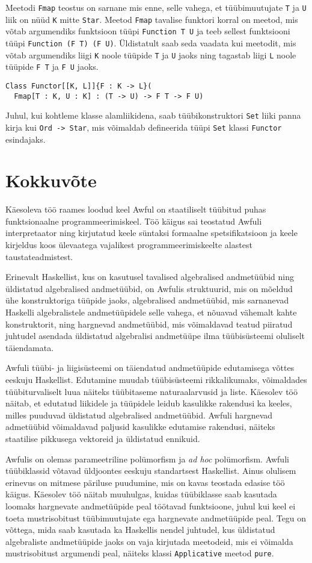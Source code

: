 \documentclass[12pt]{article}
\newcommand\peatykk[1]{
  \clearpage
  \section{#1}}
\begin{document}
        Meetodi \verb!Fmap! teostus on sarnane mis enne, selle vahega, et tüübimuutujate \verb!T! ja \verb!U! liik on nüüd \verb!K! mitte \verb!Star!. Meetod \verb!Fmap! tavalise funktori korral on meetod, mis võtab argumendiks funktsioon tüüpi \verb!Function T U! ja teeb sellest funktsiooni tüüpi \verb!Function (F T) (F U)!. Üldistatult saab seda vaadata kui meetodit, mis võtab argumendiks liigi \verb!K! noole tüüpide \verb!T! ja \verb!U! jaoks ning tagastab liigi \verb!L! noole tüüpide \verb!F T! ja \verb!F U! jaoks.

        \begin{verbatim}Class Functor[[K, L]]{F : K -> L}(
  Fmap[T : K, U : K] : (T -> U) -> F T -> F U)\end{verbatim}

        Juhul, kui kohtleme klasse alamliikidena, saab tüübikonstruktori \verb!Set! liiki panna kirja kui \verb!Ord -> Star!, mis võimaldab defineerida tüüpi \verb!Set! klassi \verb!Functor! esindajaks.
  \peatykk{Kokkuvõte}
    Käesoleva töö raames loodud keel Awful on staatiliselt tüübitud puhas funktsionaalne programmeerimiskeel. Töö käigus sai teostatud Awfuli interpretaator ning kirjutatud keele süntaksi formaalne spetsifikatsioon ja keele kirjeldus koos ülevaatega vajalikest programmeerimiskeelte alastest taustateadmistest.

    Erinevalt Haskellist, kus on kasutusel tavalised algebralised andmetüübid ning üldistatud algebralised andmetüübid, on Awfulis struktuurid, mis on mõeldud ühe konstruktoriga tüüpide jaoks, algebralised andmetüübid, mis sarnanevad Haskelli algebralistele andmetüüpidele selle vahega, et nõuavad vähemalt kahte konstruktorit, ning hargnevad andmetüübid, mis võimaldavad teatud piiratud juhtudel asendada üldistatud algebralisi andmetüüpe ilma tüübisüsteemi oluliselt täiendamata.

    Awfuli tüübi- ja liigisüsteemi on täiendatud andmetüüpide edutamisega võttes eeskuju Haskellist. Edutamine muudab tüübisüsteemi rikkalikumaks, võimaldades tüübiturvaliselt luua näiteks tüübitaseme naturaalarvusid ja liste. Käesolev töö näitab, et edutatud liikidele ja tüüpidele leidub kasulikke rakendusi ka keeles, milles puuduvad üldistatud algebralised andmetüübid. Awfuli hargnevad admetüübid võimaldavad paljusid kasulikke edutamise rakendusi, näiteks staatilise pikkusega vektoreid ja üldistatud ennikuid.

    Awfulis on olemas parameetriline polümorfism ja \textit{ad hoc} polümorfism. Awfuli tüübiklassid võtavad üldjoontes eeskuju standartsest Haskellist. Ainus olulisem erinevus on mitmese päriluse puudumine, mis on kavas teostada edasise töö käigus. Käesolev töö näitab muuhulgas, kuidas tüübiklasse saab kasutada loomaks hargnevate andmetüüpide peal töötavad funktsioone, juhul kui keel ei toeta mustrisobitust tüübimuutujate ega hargnevate andmetüüpide peal. Tegu on võttega, mida saab kasutada ka Haskellis nendel juhtudel, kus üldistatud algebraliste andmetüüpide jaoks on vaja kirjutada meetodeid, mis ei võimalda mustrisobitust argumendi peal, näiteks klassi \verb!Applicative! meetod \verb!pure!.
\end{document}
